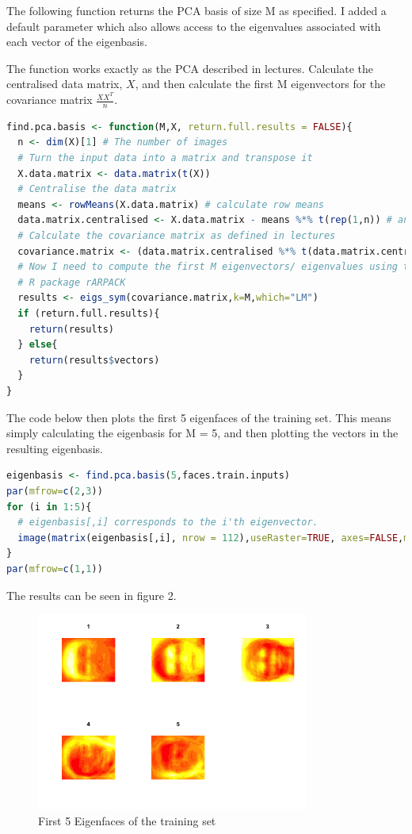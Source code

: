 \documentclass[11pt]{article}
\begin{document}
The following function returns the PCA basis of size M as specified. I added a default parameter which also allows access to the eigenvalues associated with each vector of the eigenbasis.

The function works exactly as the PCA described in lectures. Calculate the centralised data matrix, $X$, and then calculate the first M eigenvectors for the covariance matrix $\frac{XX^{T}}{n}$.

\begin{lstlisting}[linewidth=18.4cm,language=R]
find.pca.basis <- function(M,X, return.full.results = FALSE){
  n <- dim(X)[1] # The number of images
  # Turn the input data into a matrix and transpose it
  X.data.matrix <- data.matrix(t(X))
  # Centralise the data matrix
  means <- rowMeans(X.data.matrix) # calculate row means
  data.matrix.centralised <- X.data.matrix - means %*% t(rep(1,n)) # and subtract
  # Calculate the covariance matrix as defined in lectures
  covariance.matrix <- (data.matrix.centralised %*% t(data.matrix.centralised)) / n
  # Now I need to compute the first M eigenvectors/ eigenvalues using the 
  # R package rARPACK
  results <- eigs_sym(covariance.matrix,k=M,which="LM")
  if (return.full.results){
    return(results)
  } else{
    return(results$vectors)
  }
}
\end{lstlisting}

The code below then plots the first 5 eigenfaces of the training set. This means simply calculating the eigenbasis for M = 5, and then plotting the vectors in the resulting eigenbasis.
\begin{lstlisting}[linewidth=18.4cm,language=R]
eigenbasis <- find.pca.basis(5,faces.train.inputs)
par(mfrow=c(2,3))
for (i in 1:5){
  # eigenbasis[,i] corresponds to the i'th eigenvector.
  image(matrix(eigenbasis[,i], nrow = 112),useRaster=TRUE, axes=FALSE,main=i)
}
par(mfrow=c(1,1))
\end{lstlisting}

The results can be seen in figure 2.

\begin{figure}
\caption{First 5 Eigenfaces of the  training set}
\centering
\includegraphics[width=0.8\textwidth]{eigenface}
\end{figure}
\end{document}
